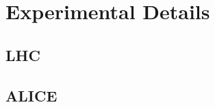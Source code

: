 
\section{Experimental Details}
\label{sec:exp}

\subsection{LHC}
\label{sec:lhc}
\subsection{ALICE}
\label{sec:alice}